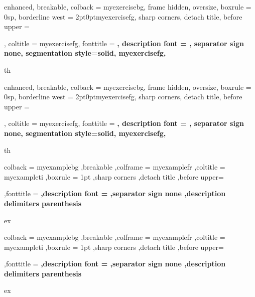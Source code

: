 
{%
	enhanced,
	breakable,
	colback = myexercisebg,
	frame hidden,
        oversize,
	boxrule = 0sp,
	borderline west = {2pt}{0pt}{myexercisefg},
	sharp corners,
	detach title,
	before upper = \tcbtitle\par\smallskip,
	coltitle = myexercisefg,
	fonttitle = \bfseries\sffamily,
	description font = \mdseries,
	separator sign none,
	segmentation style={solid, myexercisefg},
}
{th}

{%
	enhanced,
	breakable,
	colback = myexercisebg,
	frame hidden,
        oversize,
	boxrule = 0sp,
	borderline west = {2pt}{0pt}{myexercisefg},
	sharp corners,
	detach title,
	before upper = \tcbtitle\par\smallskip,
	coltitle = myexercisefg,
	fonttitle = \bfseries\sffamily,
	description font = \mdseries,
	separator sign none,
	segmentation style={solid, myexercisefg},
}
{th}

{%
	colback = myexamplebg
	,breakable
	,colframe = myexamplefr
	,coltitle = myexampleti
	,boxrule = 1pt
	,sharp corners
	,detach title
	,before upper=\tcbtitle\par\smallskip
	,fonttitle = \bfseries
	,description font = \mdseries
	,separator sign none
	,description delimiters parenthesis
}
{ex}

{%
	colback = myexamplebg
	,breakable
	,colframe = myexamplefr
	,coltitle = myexampleti
	,boxrule = 1pt
	,sharp corners
	,detach title
	,before upper=\tcbtitle\par\smallskip
	,fonttitle = \bfseries
	,description font = \mdseries
	,separator sign none
	,description delimiters parenthesis
}
{ex}


